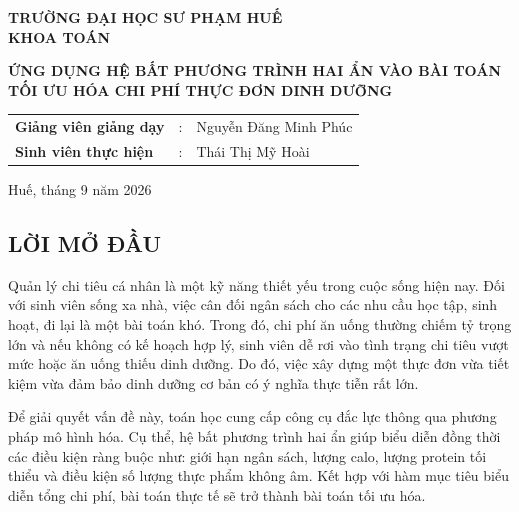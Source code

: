 \documentclass[12pt,a4paper]{article}
\begin{document}
\begin{titlepage}

    \centering

    \vspace*{1.5cm}

    {\large \textbf{TRƯỜNG ĐẠI HỌC SƯ PHẠM HUẾ}}\\[0.3cm]
    {\large \textbf{KHOA TOÁN}}

    \vspace{4cm}

    {\LARGE \textbf{
    ỨNG DỤNG HỆ BẤT PHƯƠNG TRÌNH HAI ẨN
    VÀO BÀI TOÁN TỐI ƯU HÓA CHI PHÍ
    THỰC ĐƠN DINH DƯỠNG
    }}

    \vspace{2cm}

    {\large
    \begin{tabular}{lcl}
        \textbf{Giảng viên giảng dạy} & : & Nguyễn Đăng Minh Phúc\\[0.3cm]
\textbf{Sinh viên thực hiện} & : & Thái Thị Mỹ Hoài \\

    \end{tabular}
    }

    \vfill

    {\large Huế, tháng 9 năm 2026}

\end{titlepage}


\begin{center}
    \section*{LỜI MỞ ĐẦU}
\end{center}

Quản lý chi tiêu cá nhân là một kỹ năng thiết yếu trong cuộc sống hiện nay. Đối với sinh viên sống xa nhà, việc cân đối ngân sách cho các nhu cầu học tập, sinh hoạt, đi lại là một bài toán khó. Trong đó, chi phí ăn uống thường chiếm tỷ trọng lớn và nếu không có kế hoạch hợp lý, sinh viên dễ rơi vào tình trạng chi tiêu vượt mức hoặc ăn uống thiếu dinh dưỡng. Do đó, việc xây dựng một thực đơn vừa tiết kiệm vừa đảm bảo dinh dưỡng cơ bản có ý nghĩa thực tiễn rất lớn.

Để giải quyết vấn đề này, toán học cung cấp công cụ đắc lực thông qua phương pháp mô hình hóa. Cụ thể, hệ bất phương trình hai ẩn giúp biểu diễn đồng thời các điều kiện ràng buộc như: giới hạn ngân sách, lượng calo, lượng protein tối thiểu và điều kiện số lượng thực phẩm không âm. Kết hợp với hàm mục tiêu biểu diễn tổng chi phí, bài toán thực tế sẽ trở thành bài toán tối ưu hóa.
\end{document}
